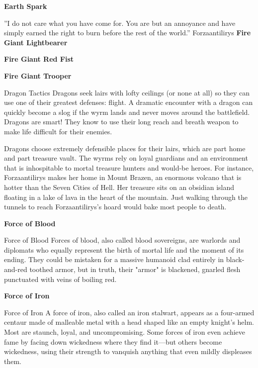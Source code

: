 \documentclass[10pt,a4paper,twoside,bg=print,twocolumn,openany,nodeprecatedcode]{dndbook}
\begin{document}
\textbf{Earth Spark}

\DndQuote%
{}
{''I do not care what you have come for. You are but an annoyance and have simply earned the right to burn before the rest of the world.''}
{Forzaantilirys}
\textbf{Fire Giant Lightbearer}

\textbf{Fire Giant Red Fist}

\textbf{Fire Giant Trooper}

\begin{DndSidebar}[float=!b]{Dragon Tactics}
Dragons seek lairs with lofty ceilings (or none at all) so they can use one of their greatest defenses: flight. A dramatic encounter with a dragon can quickly become a slog if the wyrm lands and never moves around the battlefield. Dragons are smart! They know to use their long reach and breath weapon to make life difficult for their enemies.



Dragons choose extremely defensible places for their lairs, which are part home and part treasure vault. The wyrms rely on loyal guardians and an environment that is inhospitable to mortal treasure hunters and would-be heroes. For instance, Forzaantilirys makes her home in Mount Brazen, an enormous volcano that is hotter than the Seven Cities of Hell. Her treasure sits on an obsidian island floating in a lake of lava in the heart of the mountain. Just walking through the tunnels to reach Forzaantilirys's hoard would bake most people to death.



\end{DndSidebar}

\textbf{Force of Blood}

\begin{DndSidebar}[float=!b]{Force of Blood}
Forces of blood, also called blood sovereigns, are warlords and diplomats who equally represent the birth of mortal life and the moment of its ending. They could be mistaken for a massive humanoid clad entirely in black-and-red toothed armor, but in truth, their "armor" is blackened, gnarled flesh punctuated with veins of boiling red.



\end{DndSidebar}

\textbf{Force of Iron}

\begin{DndSidebar}[float=!b]{Force of Iron}
A force of iron, also called an iron stalwart, appears as a four-armed centaur made of malleable metal with a head shaped like an empty knight's helm. Most are staunch, loyal, and uncompromising. Some forces of iron even achieve fame by facing down wickedness where they find it—but others become wickedness, using their strength to vanquish anything that even mildly displeases them.



\end{DndSidebar}
\end{document}
